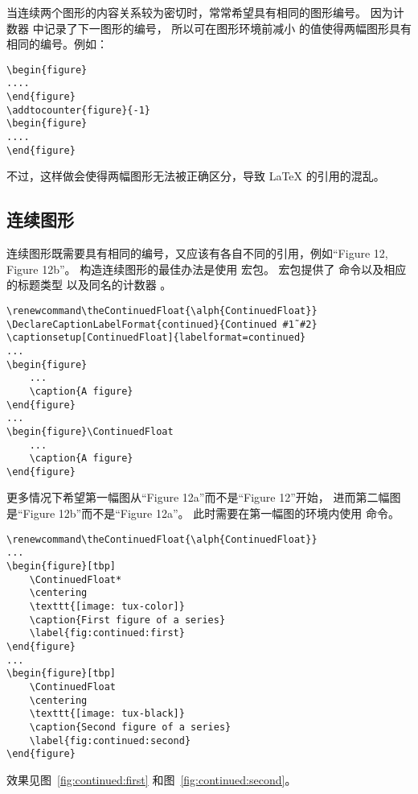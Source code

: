 当连续两个图形的内容关系较为密切时，常常希望具有相同的图形编号。
因为计数器  中记录了下一图形的编号，
所以可在图形环境前减小  的值使得两幅图形具有相同的编号。例如：
\begin{lstlisting}
\begin{figure}
....
\end{figure}
\addtocounter{figure}{-1}
\begin{figure}
....
\end{figure}
\end{lstlisting}
不过，这样做会使得两幅图形无法被正确区分，导致 \LaTeX{} 的引用的混乱。

\subsection{连续图形}\label{ssec:continuedfloat}

连续图形既需要具有相同的编号，又应该有各自不同的引用，例如“Figure 12, Figure 12b”。
构造连续图形的最佳办法是使用  宏包。
 宏包提供了  命令以及相应的标题类型  以及同名的计数器 。
\begin{lstlisting}
\renewcommand\theContinuedFloat{\alph{ContinuedFloat}}
\DeclareCaptionLabelFormat{continued}{Continued #1˜#2}
\captionsetup[ContinuedFloat]{labelformat=continued}
...
\begin{figure}
	...
	\caption{A figure}
\end{figure}
...
\begin{figure}\ContinuedFloat
	...
	\caption{A figure}
\end{figure}
\end{lstlisting}

更多情况下希望第一幅图从“Figure 12a”而不是“Figure 12”开始，
进而第二幅图是“Figure 12b”而不是“Figure 12a”。
此时需要在第一幅图的环境内使用  命令。
\begin{lstlisting}
\renewcommand\theContinuedFloat{\alph{ContinuedFloat}}
...
\begin{figure}[tbp]
	\ContinuedFloat*
	\centering
	\texttt{[image: tux-color]}
	\caption{First figure of a series}
	\label{fig:continued:first}
\end{figure}
...
\begin{figure}[tbp]
	\ContinuedFloat
	\centering
	\texttt{[image: tux-black]}
	\caption{Second figure of a series}
	\label{fig:continued:second}
\end{figure}
\end{lstlisting}
效果见图~\ref{fig:continued:first} 和图~\ref{fig:continued:second}。

